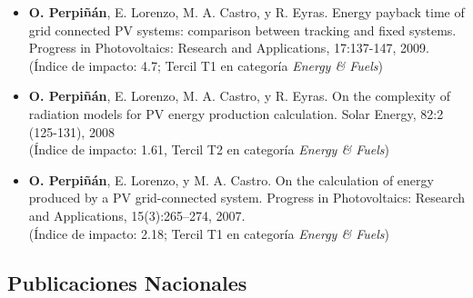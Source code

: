 \documentclass[article, a4paper]{memoir}
\begin{document}
\begin{itemize}
\item \textbf{O. Perpiñán}, E. Lorenzo, M. A. Castro, y R. Eyras. Energy payback time of grid connected PV systems: comparison between tracking and fixed systems. Progress in Photovoltaics: Research and Applications, 17:137-147, 2009.\\ (Índice de impacto: 4.7; Tercil T1 en categoría \emph{Energy \& Fuels})

\item \textbf{O. Perpiñán}, E. Lorenzo, M. A. Castro, y R. Eyras. On the complexity of radiation models for PV energy production calculation. Solar Energy, 82:2 (125-131), 2008\\ (Índice de impacto: 1.61, Tercil T2 en categoría \emph{Energy \& Fuels})

\item \textbf{O. Perpiñán}, E. Lorenzo, y M. A. Castro. On the calculation of energy produced by a PV grid-connected system. Progress in Photovoltaics: Research and Applications, 15(3):265–274, 2007.\\ (Índice de impacto: 2.18; Tercil T1 en categoría \emph{Energy \& Fuels})
\end{itemize}

\subsection{Publicaciones Nacionales}
\label{sec-7-2}
\end{document}
